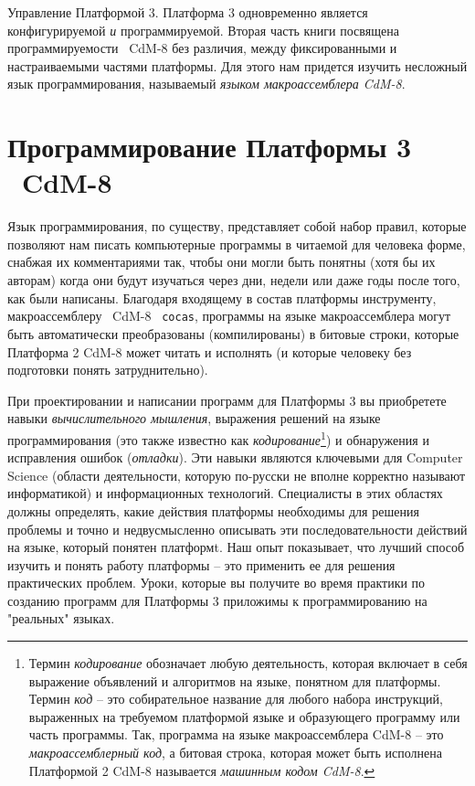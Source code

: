 Управление Платформой 3.  Платформа 3 одновременно является конфигурируемой \emph{и} программируемой.  Вторая часть книги посвящена программируемости  CdM-8 без различия, между фиксированными и настраиваемыми частями платформы.  Для этого нам придется изучить несложный язык программирования, называемый  \emph{языком макроассемблера CdM-8}.

\section{Программирование Платформы 3  CdM-8}

 Язык программирования, по существу, представляет собой набор правил, которые позволяют нам писать компьютерные программы в читаемой для человека форме, снабжая их комментариями так, чтобы они могли быть понятны (хотя бы их авторам) когда они будут изучаться через дни, недели или даже годы после того, как были написаны.  Благодаря входящему в состав платформы инструменту, макроассемблеру  CdM-8  {\tt cocas}, программы на языке макроассемблера могут быть автоматически преобразованы (компилированы) в битовые строки, которые Платформа 2 CdM-8 может читать и исполнять (и которые человеку без подготовки понять затруднительно).

При проектировании и написании программ для Платформы 3 вы приобретете навыки \emph{вычислительного мышления}, выражения решений на языке программирования (это также известно как \emph{кодирование}\footnote{Термин \emph{кодирование} обозначает любую деятельность, которая включает в себя выражение объявлений и алгоритмов на языке, понятном для платформы.  Термин  \emph{код} -- это собирательное название для любого набора инструкций, выраженных на требуемом платформой языке и образующего программу или часть программы.  Так, программа на языке макроассемблера CdM-8 -- это \emph{макроассемблерный код}, а битовая строка, которая может быть исполнена Платформой 2 CdM-8 называется \emph{машинным кодом CdM-8}.}) и обнаружения и исправления ошибок (\emph{отладки}).  Эти навыки являются ключевыми для Computer Science (области деятельности, которую по-русски не вполне корректно называют информатикой) и информационных технологий.  Специалисты в этих областях должны определять, какие действия платформы необходимы для решения проблемы и точно и недвусмысленно описывать эти последовательности действий на языке, который понятен платформt.  Наш опыт показывает, что лучший способ изучить и понять работу платформы -- это применить ее для решения практических проблем.  Уроки, которые вы получите во время практики по созданию программ для Платформы 3 приложимы к программированию на "реальных" языках.

